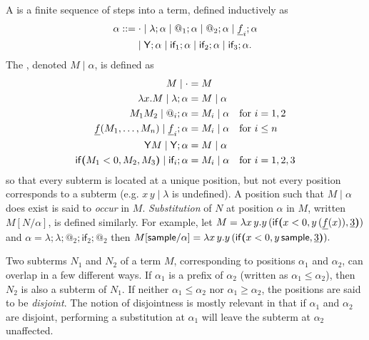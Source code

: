 A  is a finite sequence of steps into a term, defined inductively as
\begin{align*}
\alpha ::= & \; {\cdot} \mid \lambda ; \alpha \mid @_1 ; \alpha \mid @_2 ; \alpha \mid \underline f_i ; \alpha \\
& {} \mid \mathsf{Y} ; \alpha \mid \textsf{if}_1 ; \alpha \mid \textsf{if}_2 ; \alpha \mid \textsf{if}_3 ; \alpha.
\end{align*}
The , denoted $M \mid \alpha$, is defined as
\begin{align*}
M \mid \cdot & = M \\
\lambda x. M \mid \lambda ; \alpha & = M \mid \alpha \\
M_1 M_2 \mid @_i ; \alpha & = M_i \mid \alpha \quad \text{for } i = 1,2 \\
\underline f(M_1,\dots,M_n) \mid \underline f_i ; \alpha & = M_i \mid \alpha \quad \text{for }i \leq n \\
\mathsf{Y} M \mid \mathsf{Y} ; \alpha & = M \mid \alpha \\
\mathsf{if}\boldsymbol{(}M_1 < 0, M_2, M_3\boldsymbol{)} \mid \textsf{if}_i ; \alpha & = M_i \mid \alpha \quad \text{for } i = 1,2,3
\end{align*}
so that every subterm is located at a unique position, but not every position corresponds to a subterm (e.g. $x \, y \mid \lambda$ is undefined). 
A position such that $M\mid \alpha$ does exist is said to \emph{occur} in $M$. 
\emph{Substitution} of $N$ at position $\alpha$ in $M$, written $M[N/\alpha]$, is defined similarly.
For example, let 
\(
M = \lambda x \, y. y \, (\mathsf{if}\boldsymbol{(}x < 0, y \, (\underline f (x)), \underline 3\boldsymbol{)})
\)
and
\(
\alpha =\lambda ; \lambda ; @_2 ; \textsf{if}_2 ; @_2
\)
then 
\(
M[\mathsf{sample} / \alpha] = \lambda x \, y. y \, (\mathsf{if}\boldsymbol{(}x < 0, y \, \mathsf{sample}, \underline 3\boldsymbol{)}).
\)

Two subterms $N_1$ and $N_2$ of a term $M$, corresponding to positions $\alpha_1$ and $\alpha_2$, can overlap in a few different ways. 
If $\alpha_1$ is a prefix of $\alpha_2$ (written as $\alpha_1 \leq \alpha_2$), then $N_2$ is also a subterm of $N_1$. If neither $\alpha_1 \leq \alpha_2$ nor $\alpha_1 \geq \alpha_2$, the positions are said to be \emph{disjoint}. 
The notion of disjointness is mostly relevant in that if $\alpha_1$ and $\alpha_2$ are disjoint, performing a substitution at $\alpha_1$ will leave the subterm at $\alpha_2$ unaffected.


